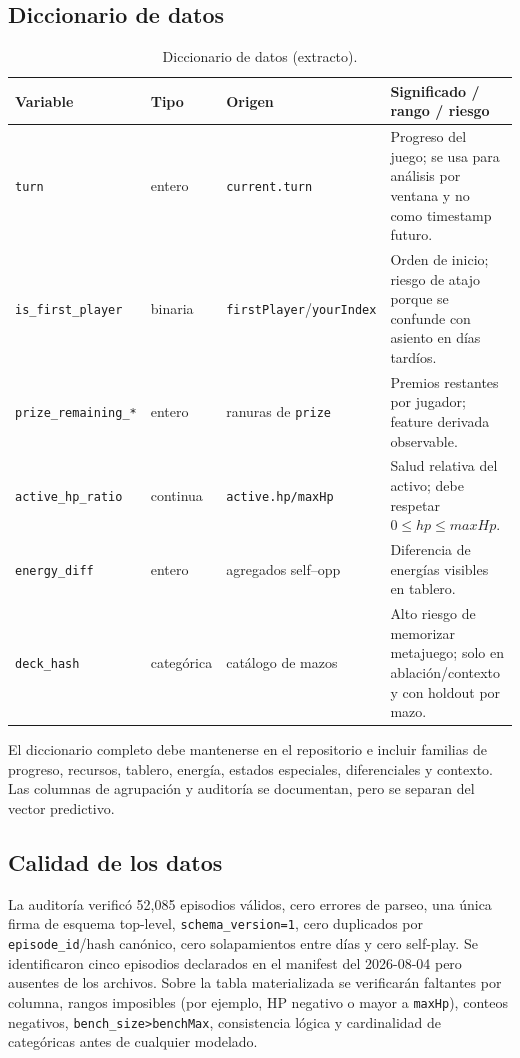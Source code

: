 \subsection{Diccionario de datos}
\label{subsec:diccionario}
\begin{table}[!t]
\centering
\caption{Diccionario de datos (extracto).}
\label{tab:diccionario}
\footnotesize
\begin{tabularx}{\columnwidth}{@{}P{1.7cm} P{1.2cm} P{1.6cm} Y@{}}
\toprule
\textbf{Variable} & \textbf{Tipo} & \textbf{Origen} &
\textbf{Significado / rango / riesgo}\\
\midrule
\texttt{turn} & entero & \texttt{current.turn} & Progreso del juego; se usa para análisis por ventana y no como timestamp futuro.\\
\texttt{is\_first\_player} & binaria & \texttt{firstPlayer}/\texttt{yourIndex} & Orden de inicio; riesgo de atajo porque se confunde con asiento en días tardíos.\\
\texttt{prize\_remaining\_*} & entero & ranuras de \texttt{prize} & Premios restantes por jugador; feature derivada observable.\\
\texttt{active\_hp\_ratio} & continua & \texttt{active.hp/maxHp} & Salud relativa del activo; debe respetar $0\leq hp\leq maxHp$.\\
\texttt{energy\_diff} & entero & agregados self--opp & Diferencia de energías visibles en tablero.\\
\texttt{deck\_hash} & categórica & catálogo de mazos & Alto riesgo de memorizar metajuego; solo en ablación/contexto y con holdout por mazo.\\
\bottomrule
\end{tabularx}
\end{table}

El diccionario completo debe mantenerse en el repositorio e incluir
familias de progreso, recursos, tablero, energía, estados especiales,
diferenciales y contexto. Las columnas de agrupación y auditoría se
documentan, pero se separan del vector predictivo.

\subsection{Calidad de los datos}
\label{subsec:calidad}
La auditoría verificó 52,085 episodios válidos, cero errores de parseo,
una única firma de esquema top-level, \texttt{schema\_version=1}, cero
duplicados por \texttt{episode\_id}/hash canónico, cero solapamientos
entre días y cero self-play. Se identificaron cinco episodios declarados
en el manifest del 2026-08-04 pero ausentes de los archivos. Sobre la
tabla materializada se verificarán faltantes por columna, rangos
imposibles (por ejemplo, HP negativo o mayor a \texttt{maxHp}), conteos
negativos, \texttt{bench\_size>benchMax}, consistencia lógica y
cardinalidad de categóricas antes de cualquier modelado.

